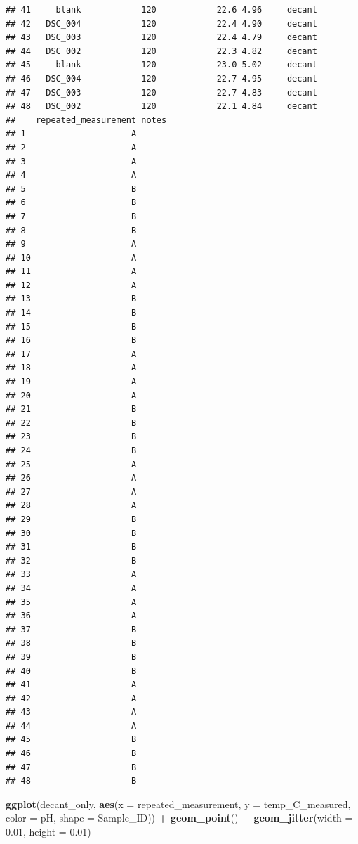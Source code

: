 \documentclass[
]{article}
\newenvironment{Shaded}{\begin{snugshade}}{\end{snugshade}}
\newcommand{\AttributeTok}[1]{\textcolor[rgb]{0.13,0.29,0.53}{#1}}
\newcommand{\FloatTok}[1]{\textcolor[rgb]{0.00,0.00,0.81}{#1}}
\newcommand{\FunctionTok}[1]{\textcolor[rgb]{0.13,0.29,0.53}{\textbf{#1}}}
\newcommand{\NormalTok}[1]{#1}
\newcommand{\SpecialCharTok}[1]{\textcolor[rgb]{0.81,0.36,0.00}{\textbf{#1}}}
\begin{document}
\begin{verbatim}
## 41     blank            120            22.6 4.96     decant
## 42   DSC_004            120            22.4 4.90     decant
## 43   DSC_003            120            22.4 4.79     decant
## 44   DSC_002            120            22.3 4.82     decant
## 45     blank            120            23.0 5.02     decant
## 46   DSC_004            120            22.7 4.95     decant
## 47   DSC_003            120            22.7 4.83     decant
## 48   DSC_002            120            22.1 4.84     decant
##    repeated_measurement notes
## 1                     A      
## 2                     A      
## 3                     A      
## 4                     A      
## 5                     B      
## 6                     B      
## 7                     B      
## 8                     B      
## 9                     A      
## 10                    A      
## 11                    A      
## 12                    A      
## 13                    B      
## 14                    B      
## 15                    B      
## 16                    B      
## 17                    A      
## 18                    A      
## 19                    A      
## 20                    A      
## 21                    B      
## 22                    B      
## 23                    B      
## 24                    B      
## 25                    A      
## 26                    A      
## 27                    A      
## 28                    A      
## 29                    B      
## 30                    B      
## 31                    B      
## 32                    B      
## 33                    A      
## 34                    A      
## 35                    A      
## 36                    A      
## 37                    B      
## 38                    B      
## 39                    B      
## 40                    B      
## 41                    A      
## 42                    A      
## 43                    A      
## 44                    A      
## 45                    B      
## 46                    B      
## 47                    B      
## 48                    B
\end{verbatim}

\begin{Shaded}
\begin{Highlighting}[]
\FunctionTok{ggplot}\NormalTok{(decant\_only, }\FunctionTok{aes}\NormalTok{(}\AttributeTok{x =}\NormalTok{ repeated\_measurement, }\AttributeTok{y =}\NormalTok{ temp\_C\_measured, }\AttributeTok{color =}\NormalTok{ pH, }\AttributeTok{shape =}\NormalTok{ Sample\_ID)) }\SpecialCharTok{+}
  \FunctionTok{geom\_point}\NormalTok{() }\SpecialCharTok{+} \FunctionTok{geom\_jitter}\NormalTok{(}\AttributeTok{width =} \FloatTok{0.01}\NormalTok{, }\AttributeTok{height =} \FloatTok{0.01}\NormalTok{)}
\end{Highlighting}
\end{Shaded}
\end{document}
